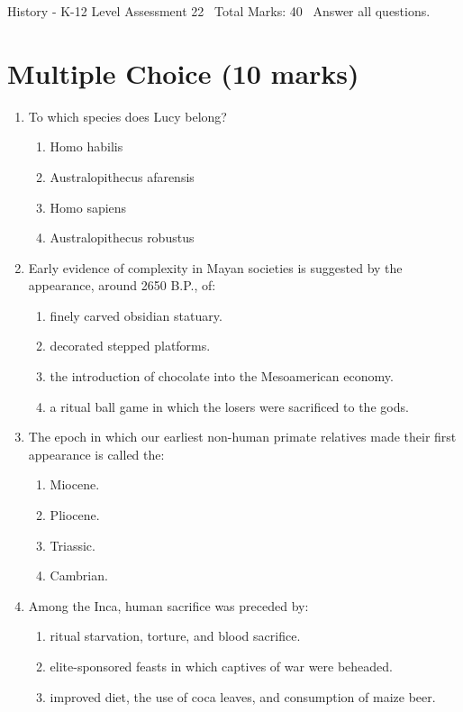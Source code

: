 \documentclass[12pt]{article}
\begin{document}
\begin{center}
History - K-12 Level Assessment 22 \
Total Marks: 40 \
Answer all questions.
\end{center}

\section*{Multiple Choice (10 marks)}
\begin{enumerate}[label=\arabic*.]
\item To which species does Lucy belong?
\begin{enumerate}[label=(\alph*)]
    \item Homo habilis
    \item Australopithecus afarensis
    \item Homo sapiens
    \item Australopithecus robustus
\end{enumerate}
\item Early evidence of complexity in Mayan societies is suggested by the appearance, around 2650 B.P., of:
\begin{enumerate}[label=(\alph*)]
    \item finely carved obsidian statuary.
    \item decorated stepped platforms.
    \item the introduction of chocolate into the Mesoamerican economy.
    \item a ritual ball game in which the losers were sacrificed to the gods.
\end{enumerate}
\item The epoch in which our earliest non-human primate relatives made their first appearance is called the:
\begin{enumerate}[label=(\alph*)]
    \item Miocene.
    \item Pliocene.
    \item Triassic.
    \item Cambrian.
\end{enumerate}
\item Among the Inca, human sacrifice was preceded by:
\begin{enumerate}[label=(\alph*)]
    \item ritual starvation, torture, and blood sacrifice.
    \item elite-sponsored feasts in which captives of war were beheaded.
    \item improved diet, the use of coca leaves, and consumption of maize beer.

\end{enumerate}
\end{enumerate}
\end{document}

